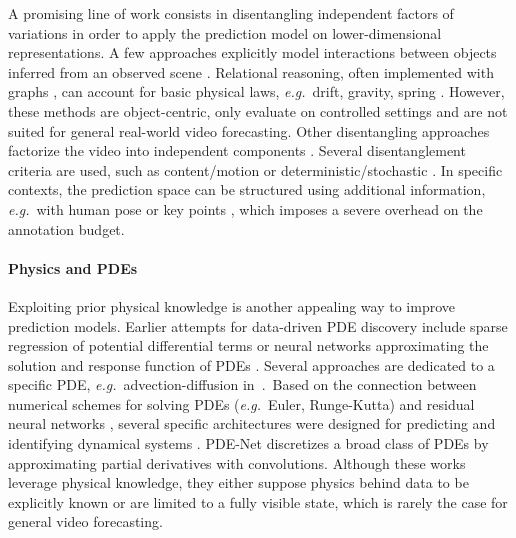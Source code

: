 \documentclass[10pt,twocolumn,letterpaper]{article}
\def\eg{\textit{e.g.}~}
\begin{document}
A promising line of work consists in disentangling independent factors of variations in order to apply the prediction model on lower-dimensional representations. A few approaches explicitly model interactions between objects inferred from an observed scene \cite{eslami2016attend,kosiorek2018sequential,ye2019compositional}. Relational reasoning, often implemented with graphs \cite{battaglia2016interaction,kipf2018neural,sanchez2018graph,palm2018recurrent,van2018relational}, can account for basic physical laws, \eg drift, gravity, spring \cite{watters2017visual,wu2017learning,mrowca2018flexible}. However, these methods are object-centric, only evaluate on controlled settings and are not suited for general real-world video forecasting.
Other disentangling approaches factorize the video into independent components \cite{villegas2017decomposing,tulyakov2018mocogan,denton2017unsupervised,hsieh2018learning,gao2019disentangling}. Several disentanglement criteria are used, such as content/motion \cite{villegas2017decomposing} or deterministic/stochastic \cite{denton2017unsupervised}. In specific contexts, the prediction space can be structured using additional information, \eg with human pose \cite{villegas2017learning,walker2017pose} or key points \cite{minderer2019unsupervised}, which imposes a severe overhead on the annotation budget. \vspace{-0.2cm} 

\paragraph{Physics and PDEs}
Exploiting prior physical knowledge is another appealing way to improve prediction models. Earlier attempts for data-driven PDE discovery include sparse regression of potential differential terms \cite{brunton2016discovering,rudy2017data,schaeffer2017learning} or  neural networks  approximating the solution and response function of PDEs \cite{raissi2017physics,raissi2018deep,seo2019differentiable}. Several approaches are dedicated to a specific PDE, \eg  advection-diffusion in~\cite{de2017deep}.~Based on the connection between numerical schemes for solving PDEs (\eg Euler, Runge-Kutta) and residual neural networks \cite{weinan2017proposal,lu2018beyond,chen2018neural,zhu2018convolutional}, several specific architectures were designed for predicting and identifying dynamical systems \cite{fablet2018bilinear,long2018pde,qin2019data}. 
PDE-Net \cite{long2018pde,long2019pde} discretizes a broad class of PDEs by approximating partial derivatives with convolutions. Although these works leverage physical knowledge, they either suppose physics behind data to be explicitly known or are limited to a fully visible state, which is rarely the case for general video forecasting. \vspace{-0.2cm}
\end{document}
